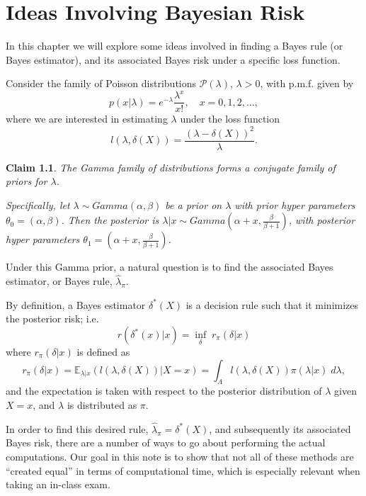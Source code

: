 \documentclass[11pt]{report}
\newtheorem{claim}{Claim}
\begin{document}
\chapter{Ideas Involving Bayesian Risk}

In this chapter we will explore some ideas involved in finding a Bayes rule (or Bayes estimator), and its associated Bayes risk under a specific loss function. 


Consider the family of Poisson distributions $\mathcal{P}(\lambda)$, $\lambda>0$, with p.m.f. given by 
$$p(x|\lambda) = e^{-\lambda}\frac{\lambda^x}{x!}, \quad x=0,1,2, \dots, $$
where we are interested in estimating $\lambda$ under the loss function
\begin{equation} \label{eq:loss}
l(\lambda,\delta(X)) = \frac{(\lambda-\delta(X))^2}{\lambda}.
\end{equation}
	
\begin{claim}
The Gamma family of distributions forms a conjugate family of priors for $\lambda$.
		
Specifically, let $\lambda \sim Gamma(\alpha,\beta)$ be a prior on $\lambda$ with prior hyper parameters $\theta_0 = (\alpha,\beta)$. Then the posterior is $\lambda|x \sim Gamma\left(\alpha+x, \frac{\beta}{\beta+1}\right)$, with posterior hyper parameters $\theta_1 = \left(\alpha+x, \frac{\beta}{\beta+1}\right)$. 
\end{claim}
		
Under this Gamma prior, a natural question is to find the associated Bayes estimator, or Bayes rule, $\widehat{\lambda}_\pi$.

By definition, a Bayes estimator $\delta^*(X)$ is a decision rule such that it minimizes the posterior risk; i.e.  
$$r(\delta^*(x)|x) = \inf_{\delta}\; r_\pi(\delta|x) $$
where $r_\pi(\delta|x)$ is defined as 
\begin{equation}\label{eq:postrisk}
r_\pi(\delta|x) = \mathbb{E}_{\lambda|x}(l(\lambda,\delta(X))|X=x) = \int_\Lambda l(\lambda,\delta(X)) \pi(\lambda|x) \; d\lambda,
\end{equation}
and the expectation is taken with respect to the posterior distribution of $\lambda$ given $X=x$, and $\lambda$ is distributed as $\pi$. 

In order to find this desired rule, $\widehat{\lambda}_\pi = \delta^*(X)$, and subsequently its associated Bayes risk, there are a number of ways to go about performing the actual computations. Our goal in this note is to show that not all of these methods are ``created equal'' in terms of computational time, which is especially relevant when taking an in-class exam. \newline
\end{document}

